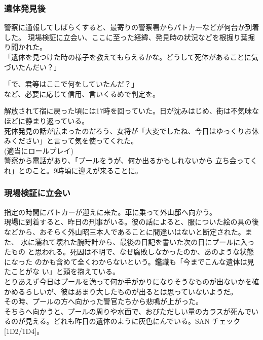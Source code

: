\documentclass[a4paper,8pt,min]{jsarticle}
\begin{document}
\subsubsection{遺体発見後}
警察に通報してしばらくすると、最寄りの警察署からパトカーなどが何台か到着
した。 現場検証に立会い、ここに至った経緯、発見時の状況などを根掘り葉掘
り聞かれた。\\

「遺体を見つけた時の様子を教えてもらえるかな。どうして死体があることに気
づいたんだい？」

「で、君等はここで何をしていたんだ？」\\

など、必要に応じて信用、言いくるめで判定を。

解放されて宿に戻った頃には17時を回っていた。日が沈みはじめ、街は不気味な
ほどに静まり返っている。\\

死体発見の話が広まったのだろう、女将が「大変でしたね、今日はゆっくりお休
みください」と言って気を使ってくれた。\\

(適当にロールプレイ)\\

警察から電話があり、「プールをうが、何か出るかもしれないから
立ち会ってくれ」とのこと。9時頃に迎えが来ることに。

\subsubsection{現場検証に立会い}
指定の時間にパトカーが迎えに来た。車に乗って外山邸へ向かう。\\

現場に到着すると、昨日の刑事がいる。彼の話によると、服についた絵の具の後
などから、おそらく外山昭三本人であることに間違いはないと断定された。また、
水に濡れて壊れた腕時計から、最後の日記を書いた次の日にプールに入ったもの
と思われる。死因は不明で、なぜ腐敗しなかったのか、あのような状態になった
のかも含めて全くわからないという。鑑識も「今までこんな遺体は見たことがな
い」と頭を抱えている。\\

とりあえず今日はプールを漁って何か手がかりになりそうなものが出ないかを確
かめるらしいが、彼はあまり大したものが出るとは思っていないようだ。\\

その時、プールの方へ向かった警官たちから悲鳴が上がった。\\

そちらへ向かうと、プールの周りや水面で、おびただしい量のカラスが死んでい
るのが見える。どれも昨日の遺体のように灰色にんでいる。SAN
チェック[1D2/1D4]。
\end{document}
